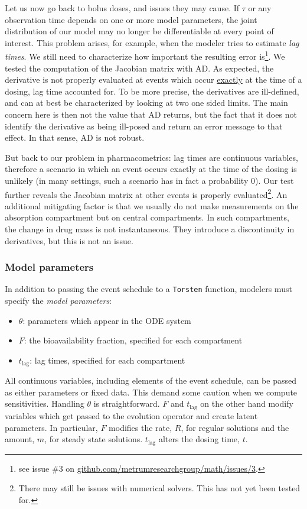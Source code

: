 \documentclass[11pt]{article}
\begin{document}
Let us now go back to bolus doses, and issues they may cause.
If $\tau$ or any observation time depends on one or 
more model parameters,
the joint distribution of our model may no longer be differentiable at every point
of interest.
This problem arises, for example, when the modeler tries to estimate \textit{lag times}.
%
We still need to characterize how important the resulting error is\footnote{see issue \#3 on 
\url{github.com/metrumresearchgroup/math/issues/3}.}. We tested the computation of the Jacobian matrix
with AD. 
As expected, the derivative is not properly evaluated  at events which occur \underline{exactly} at the time 
of a dosing, lag time accounted for.
To be more precise, the derivatives are ill-defined, and can at best be characterized by
looking at two one sided limits.
The main concern here is then not the value that AD returns, but the fact that it
does not identify the derivative as being ill-posed and return an error message to that effect.
In that sense, AD is not robust.

But back to our problem in pharmacometrics: lag times are continuous variables, therefore 
a scenario in which an event occurs exactly at the time of the dosing  is unlikely
(in many settings, such a scenario has in fact a probability 0). 
%
Our test further reveals the Jacobian matrix at other events is properly 
evaluated\footnote{There may still be issues with numerical solvers. This has not yet been tested for.}.
An additional mitigating factor is that we usually do not make measurements on the absorption
compartment but on central compartments. 
In such compartments, the change in drug mass is not instantaneous.
They introduce a discontinuity in derivatives, but this is not an issue.



\subsubsection{Model parameters}\label{modelParms}

In addition to passing the event schedule to a \texttt{Torsten} function, modelers must specify the 
\textit{model parameters}:
\begin{itemize}
  \item $\theta$: parameters which appear in the ODE system
  \item $F$: the bioavailability fraction, specified for each compartment
  \item $t_\mathrm{lag}$: lag times, specified for each compartment
\end{itemize}
%
All continuous variables, including elements of the event schedule, can be passed as either 
parameters or fixed data. This demand some caution when we compute sensitivities. Handling 
$\theta$ is straightforward.  $F$ and $t_\mathrm{lag}$ on the other hand modify variables which
get passed to the evolution operator and create latent parameters. In particular, $F$ modifies 
the rate, $R$, for regular solutions and the amount, $m$, for steady state solutions.
$t_\mathrm{lag}$ alters the dosing time, $t$. \ \\
\end{document}
